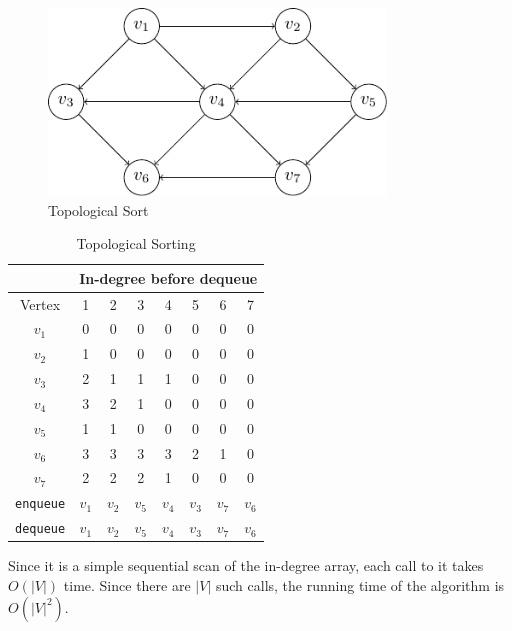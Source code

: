 \begin{minipage}{0.5\textwidth}
  \begin{figure}[H]
    \centering
    \includegraphics[width=0.8\textwidth]{Figure/topo_sort_demo.pdf}
    \caption{Topological Sort}
  \end{figure}
\end{minipage}
\begin{minipage}{0.5\textwidth}
  \begin{table}[H]
    \centering
    \begin{tabular}{c|c c c c c c c}
        \toprule
         & \multicolumn{7}{c}{In-degree before dequeue}  \\
      \midrule
        Vertex & 1 & 2 & 3 & 4 & 5 & 6 & 7  \\
      \midrule
        \(v_1\) & 0 & 0 & 0 & 0 & 0 & 0 & 0  \\
        \(v_2\) & 1 & 0 & 0 & 0 & 0 & 0 & 0  \\
        \(v_3\) & 2 & 1 & 1 & 1 & 0 & 0 & 0  \\
        \(v_4\) & 3 & 2 & 1 & 0 & 0 & 0 & 0  \\
        \(v_5\) & 1 & 1 & 0 & 0 & 0 & 0 & 0  \\
        \(v_6\) & 3 & 3 & 3 & 3 & 2 & 1 & 0  \\
        \(v_7\) & 2 & 2 & 2 & 1 & 0 & 0 & 0  \\
      \midrule
        \verb|enqueue| & \(v_1\) & \(v_2\) & \(v_5\) & \(v_4\) & \(v_3\) & \(v_7\) & \(v_6\)  \\
      \midrule
        \verb|dequeue| & \(v_1\) & \(v_2\) & \(v_5\) & \(v_4\) & \(v_3\) & \(v_7\) & \(v_6\)  \\
        \bottomrule
    \end{tabular}
    \caption{Topological Sorting}
  \end{table}
\end{minipage}

Since it is a simple sequential scan of the in-degree array, each call to it takes \(O(\vert V \vert)\) time. Since there are \(\vert V \vert\) such calls, the running time of the algorithm is \(O(\vert V \vert^2)\).

